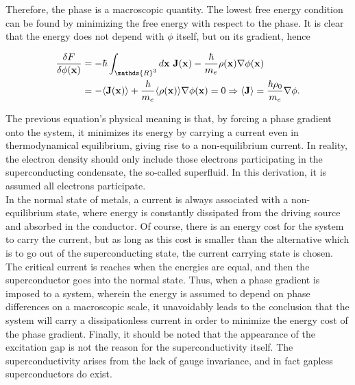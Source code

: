 \documentclass{homework}
\begin{document}
Therefore, the phase is a macroscopic quantity. The lowest free energy condition can be found by minimizing the free energy with respect to the phase. It is clear that the energy does not depend with $\phi$ itself, but on its gradient, hence

\begin{equation}
\begin{split}
    \frac{\delta F}{\delta \phi({\bf x})} &= - \hbar \int_{\mathds{R}^3} d{\bf x} \blanky {\bf J}({\bf x}) - \frac{\hbar}{m_e} \rho({\bf x}) \nabla \phi({\bf x}) \\
    &= - \langle {\bf J}({\bf x}) \rangle + \frac{\hbar}{m_e} \langle \rho({\bf x}) \rangle \nabla \phi({\bf x}) = 0   \Rightarrow \langle {\bf J} \rangle = \frac{\hbar \rho_0}{m_e} \nabla \phi.
\end{split}
\end{equation}

\begin{tcolorbox}[colback = yellow, title = Physical Context]

The previous equation's physical meaning is that, by forcing a phase gradient onto the system, it minimizes its energy by carrying a current even in thermodynamical equilibrium, giving rise to a non-equilibrium current. In reality, the electron density should only include those electrons participating in the superconducting condensate, the so-called superfluid. In this derivation, it is assumed all electrons participate. \\

In the normal state of metals, a current is always associated with a non-equilibrium state, where energy is constantly dissipated from the driving source and absorbed in the conductor. Of course, there is an energy cost for the system to carry the current, but as long as this cost is smaller than the alternative which is to go out of the superconducting state, the current carrying state is chosen. The critical current is reaches when the energies are equal, and then the superconductor goes into the normal state. Thus, when a phase gradient is imposed to a system, wherein the energy is assumed to depend on phase differences on a macroscopic scale, it unavoidably leads to the conclusion that the system will carry a dissipationless current in order to minimize the energy cost of the phase gradient. Finally, it should be noted that the appearance of the excitation gap is not the reason for the superconductivity itself. The superconductivity arises from the lack of gauge invariance, and in fact gapless superconductors do exist. \\

\end{tcolorbox}
\end{document}

